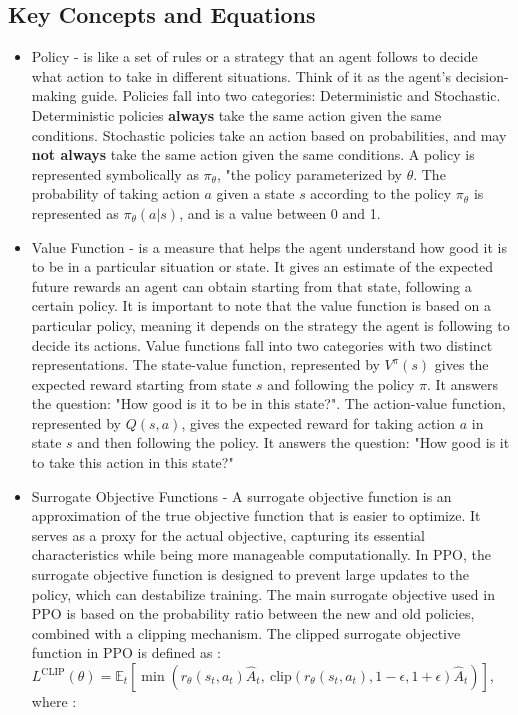 \documentclass[12pt,oneside,letterpaper]{article}
\begin{document}
\subsection{Key Concepts and Equations}
\begin{itemize} 
\item Policy -  is like a set of rules or a strategy that an agent follows to decide what action to take in different situations. Think of it as the agent's decision-making guide. Policies fall into two categories: Deterministic and Stochastic. Deterministic policies \textbf{always} take the same action given the same conditions. Stochastic policies take an action based on probabilities, and may \textbf{not always} take the same action given the same conditions. A policy is represented symbolically as $\pi_{\theta}$, "the policy parameterized by $\theta$. The probability of taking action $a$ given a state $s$ according to the policy $\pi_{\theta}$ is represented as $\pi_{\theta} (a | s )$, and is a value between 0 and 1.
\item Value Function -  is a measure that helps the agent understand how good it is to be in a particular situation or state. It gives an estimate of the expected future rewards an agent can obtain starting from that state, following a certain policy. It is important to note that the value function is based on a particular policy, meaning it depends on the strategy the agent is following to decide its actions. Value functions fall into two categories with two distinct representations. The state-value function, represented by $V^{\pi}(s)$ gives the expected reward starting from state $s$ and following the policy $\pi$. It answers the question: "How good is it to be in this state?". The action-value function, represented by $Q ( s,a )$, gives the expected reward for taking action $a$ in state $s$ and then following the policy. It answers the question: "How good is it to take this action in this state?"
\item Surrogate Objective Functions - A surrogate objective function is an approximation of the true objective function that is easier to optimize. It serves as a proxy for the actual objective, capturing its essential characteristics while being more manageable computationally. In PPO, the surrogate objective function is designed to prevent large updates to the policy, which can destabilize training. The main surrogate objective used in PPO is based on the probability ratio between the new and old policies, combined with a clipping mechanism. The clipped surrogate objective function in PPO is defined as : \(L^{\text{CLIP}}(\theta) = \mathbb{E}_t \left[ \min \left( r_\theta(s_t, a_t) \hat{A}_t, \ \text{clip}(r_\theta(s_t, a_t), 1 - \epsilon, 1 + \epsilon) \hat{A}_t \right) \right] \), where : \\

\end{itemize}
\end{document}
